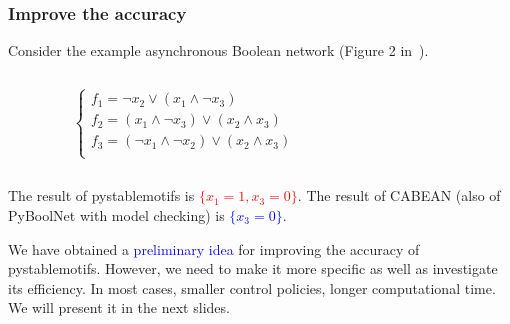 \documentclass{beamer}              %
\newcommand{\blue}[1]{\textcolor{blue}{#1}}
\newcommand{\red}[1]{\textcolor{red}{#1}}
\begin{document}
\begin{frame}
  \frametitle{Improve the accuracy}

Consider the example asynchronous Boolean network (Figure 2 in~\cite{cifuentes2021control}).
\begin{columns}
  \begin{column}{0.4\textwidth}
    \begin{equation*}
      \begin{cases}
        f_1 = \neg x_2 \lor (x_1 \land \neg x_3)\\
        f_2 = (x_1 \land \neg x_3) \lor (x_2 \land x_3)\\
        f_3 = (\neg x_1 \land \neg x_2) \lor (x_2 \land x_3)\\
      \end{cases}
    \end{equation*}
  \end{column}
  \begin{column}{0.6\textwidth}
    \centering
  \end{column}
\end{columns}

\hspace{0.8cm}

The result of pystablemotifs is \red{\(\{x_1 = 1, x_3 = 0\}\)}.
The result of CABEAN (also of PyBoolNet with model checking) is \blue{\(\{x_3 = 0\}\)}.

\hspace{0.8cm}

We have obtained a \blue{preliminary idea} for improving the accuracy of pystablemotifs.
However, we need to make it more specific as well as investigate its efficiency.
In most cases, smaller control policies, longer computational time.
We will present it in the next slides.

\end{frame}
\end{document}
